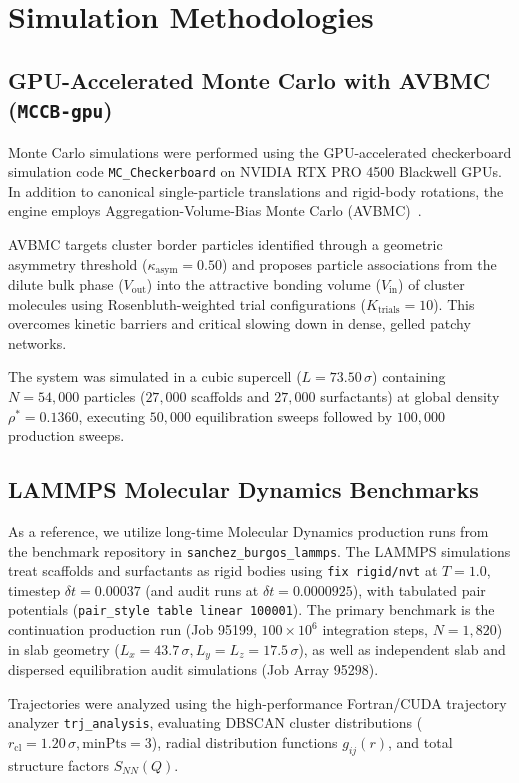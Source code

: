 \documentclass[11pt,a4paper]{article}
\begin{document}
\section{Simulation Methodologies}

\subsection{GPU-Accelerated Monte Carlo with AVBMC (\texttt{MCCB-gpu})}
Monte Carlo simulations were performed using the GPU-accelerated checkerboard simulation code \texttt{MC\_Checker\-board} on NVIDIA RTX PRO 4500 Blackwell GPUs. In addition to canonical single-particle translations and rigid-body rotations, the engine employs Aggregation-Volume-Bias Monte Carlo (AVBMC)~\cite{chen2000aggregation}. 

AVBMC targets cluster border particles identified through a geometric asymmetry threshold ($\kappa_{\text{asym}} = 0.50$) and proposes particle associations from the dilute bulk phase ($V_{\text{out}}$) into the attractive bonding volume ($V_{\text{in}}$) of cluster molecules using Rosenbluth-weighted trial configurations ($K_{\text{trials}} = 10$). This overcomes kinetic barriers and critical slowing down in dense, gelled patchy networks.

The system was simulated in a cubic supercell ($L = 73.50\,\sigma$) containing $N = 54,000$ particles ($27,000$ scaffolds and $27,000$ surfactants) at global density $\rho^* = 0.1360$, executing $50,000$ equilibration sweeps followed by $100,000$ production sweeps.

\subsection{LAMMPS Molecular Dynamics Benchmarks}
As a reference, we utilize long-time Molecular Dynamics production runs from the benchmark repository in \texttt{sanchez\_burgos\_lammps}. The LAMMPS simulations treat scaffolds and surfactants as rigid bodies using \texttt{fix rigid/nvt} at $T = 1.0$, timestep $\delta t = 0.00037$ (and audit runs at $\delta t = 0.0000925$), with tabulated pair potentials (\texttt{pair\_style table linear 100001}). The primary benchmark is the continuation production run (Job 95199, $100\times 10^6$ integration steps, $N = 1,820$) in slab geometry ($L_x = 43.7\,\sigma, L_y = L_z = 17.5\,\sigma$), as well as independent slab and dispersed equilibration audit simulations (Job Array 95298).

Trajectories were analyzed using the high-performance Fortran/CUDA trajectory analyzer \texttt{trj\_analysis}, evaluating DBSCAN cluster distributions ($r_{\text{cl}} = 1.20\,\sigma, \text{minPts} = 3$), radial distribution functions $g_{ij}(r)$, and total structure factors $S_{NN}(Q)$.
\end{document}
